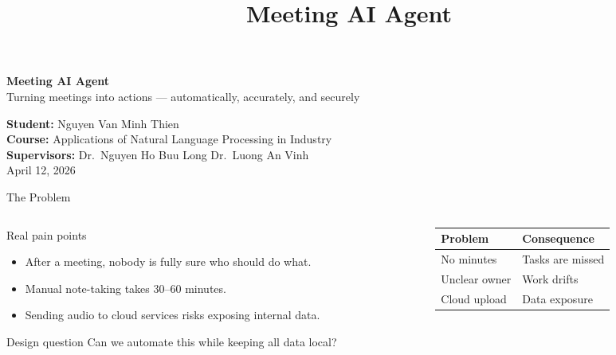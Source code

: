 \documentclass[aspectratio=169]{beamer}
\title{Meeting AI Agent}
\begin{document}
\begin{frame}
  \vspace{1.2em}
  \begin{center}
    {\fontsize{28}{34}\selectfont\textbf{Meeting AI Agent}}\\[0.5em]
    {\large Turning meetings into actions --- automatically, accurately, and securely}
  \end{center}
  \vspace{2em}
  \begin{center}
    \small
    \textbf{Student:} Nguyen Van Minh Thien\\[0.3em]
    \textbf{Course:} Applications of Natural Language Processing in Industry\\[0.2em]
    \textbf{Supervisors:} Dr.\ Nguyen Ho Buu Long \quad Dr.\ Luong An Vinh\\[0.3em]
    April 12, 2026
  \end{center}
\end{frame}

\begin{frame}{The Problem}
  \begin{columns}[T,onlytextwidth]
    \begin{column}{0.52\textwidth}
      \begin{block}{Real pain points}
        \begin{itemize}
          \item After a meeting, nobody is fully sure who should do what.
          \item Manual note-taking takes 30--60 minutes.
          \item Sending audio to cloud services risks exposing internal data.
        \end{itemize}
      \end{block}
      \begin{block}{Design question}
        Can we automate this while keeping all data local?
      \end{block}
    \end{column}
    \begin{column}{0.44\textwidth}
      \begin{tabular}{@{}lp{4cm}@{}}
        \toprule
        \textbf{Problem} & \textbf{Consequence} \\
        \midrule
        No minutes & Tasks are missed \\
        Unclear owner & Work drifts \\
        Cloud upload & Data exposure \\
        \bottomrule
      \end{tabular}
    \end{column}
  \end{columns}
\end{frame}
\end{document}
